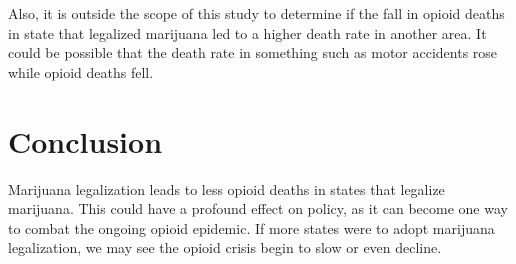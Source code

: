 \documentclass{article}
\begin{document}
Also, it is outside the scope of this study to determine if the fall in opioid deaths in state that legalized marijuana led to a higher death rate in another area. It could be possible that the death rate in something such as motor accidents rose while opioid deaths fell.


\section*{Conclusion}

Marijuana legalization leads to less opioid deaths in states that legalize marijuana. This could have a profound effect on policy, as it can become one way to combat the ongoing opioid epidemic. If more states were to adopt marijuana legalization, we may see the opioid crisis begin to slow or even decline. 


\end{document}
